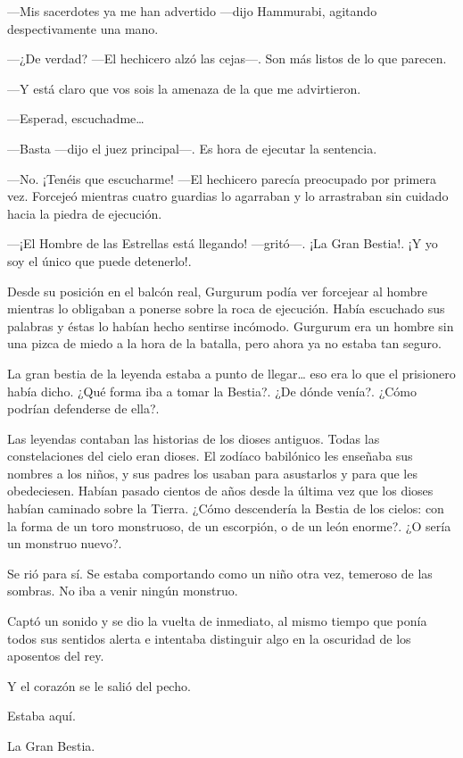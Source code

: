 ---Mis sacerdotes ya me han advertido ---dijo Hammurabi, agitando
despectivamente una mano.

---¿De verdad? ---El hechicero alzó las cejas---. Son más listos de lo
que parecen.

---Y está claro que vos sois la amenaza de la que me advirtieron.

---Esperad, escuchadme\ldots{}

---Basta ---dijo el juez principal---. Es hora de ejecutar la sentencia.

---No. ¡Tenéis que escucharme! ---El hechicero parecía preocupado por
primera vez. Forcejeó mientras cuatro guardias lo agarraban y lo
arrastraban sin cuidado hacia la piedra de ejecución.

---¡El Hombre de las Estrellas está llegando! ---gritó---. ¡La Gran
Bestia!. ¡Y yo soy el único que puede detenerlo!.

Desde su posición en el balcón real, Gurgurum podía ver forcejear al
hombre mientras lo obligaban a ponerse sobre la roca de ejecución. Había
escuchado sus palabras y éstas lo habían hecho sentirse incómodo.
Gurgurum era un hombre sin una pizca de miedo a la hora de la batalla,
pero ahora ya no estaba tan seguro.

La gran bestia de la leyenda estaba a punto de llegar\ldots{} eso era lo
que el prisionero había dicho. ¿Qué forma iba a tomar la Bestia?. ¿De
dónde venía?. ¿Cómo podrían defenderse de ella?.

Las leyendas contaban las historias de los dioses antiguos. Todas las
constelaciones del cielo eran dioses. El zodíaco babilónico les enseñaba
sus nombres a los niños, y sus padres los usaban para asustarlos y para
que les obedeciesen. Habían pasado cientos de años desde la última vez
que los dioses habían caminado sobre la Tierra. ¿Cómo descendería la
Bestia de los cielos: con la forma de un toro monstruoso, de un
escorpión, o de un león enorme?. ¿O sería un monstruo nuevo?.

Se rió para sí. Se estaba comportando como un niño otra vez, temeroso de
las sombras. No iba a venir ningún monstruo.

Captó un sonido y se dio la vuelta de inmediato, al mismo tiempo que
ponía todos sus sentidos alerta e intentaba distinguir algo en la
oscuridad de los aposentos del rey.

Y el corazón se le salió del pecho.

Estaba aquí.

La Gran Bestia.

